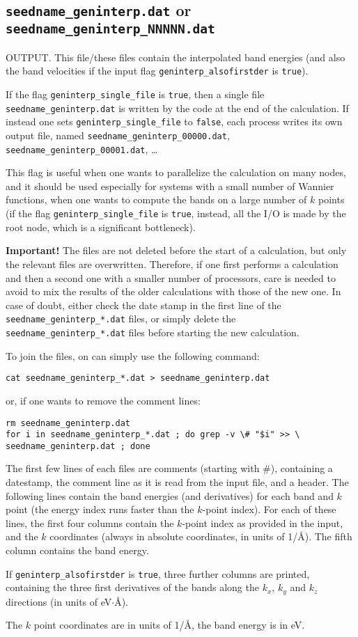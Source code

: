 \subsection{{\tt seedname\_geninterp.dat} or {\tt
    seedname\_geninterp\_NNNNN.dat}}
\label{sec:seedname.geninterp.dat}
OUTPUT. This file/these files contain the interpolated band energies (and also the band
velocities if the input flag \verb#geninterp_alsofirstder# is \verb#true#).

If the flag \verb|geninterp_single_file| is \verb|true|, then a single
file {\tt seedname\_geninterp.dat} is written by the code at the end
of the calculation. If instead one sets \verb|geninterp_single_file|
to \verb|false|, each process writes its own output file, named
{\tt seedname\_geninterp\_00000.dat}, {\tt
  seedname\_geninterp\_00001.dat}, \ldots

This flag is useful when one wants to parallelize the calculation on
many nodes, and it should be used especially for systems with a small
number of Wannier functions, when one wants to compute the bands on a
large number of $k$ points (if the flag \verb|geninterp_single_file|
is \verb|true|, instead, all the I/O is made by the root node, which
is a significant bottleneck).

{\bf Important!} The files are not deleted before the start of a
calculation, but only the relevant files are overwritten. Therefore,
if one first performs a calculation and then a second one with a smaller
number of processors, care is needed to avoid to mix the results of
the older calculations with those of the new one. In case of doubt,
either check the date stamp in the first line of the {\tt
    seedname\_geninterp\_*.dat} files, or simply
delete the  {\tt
    seedname\_geninterp\_*.dat} files before starting the new
  calculation.

To join the files, on can simply use the following command:
\begin{verbatim}
cat seedname_geninterp_*.dat > seedname_geninterp.dat
\end{verbatim}
or, if one wants to remove the comment lines:
\begin{verbatim}
rm seedname_geninterp.dat
for i in seedname_geninterp_*.dat ; do grep -v \# "$i" >> \
seedname_geninterp.dat ; done
\end{verbatim}


The first few lines of each files are comments (starting with \#),
containing a datestamp, the
comment line as it is read from the input file, and a header.
The following lines contain the band energies (and
derivatives) for each band and $k$ point (the energy
index runs faster than the $k$-point index).
For each of these lines, the first four columns contain the $k$-point index as provided in the
input, and the $k$ coordinates (always in absolute coordinates, in
units of 1/\AA).
The fifth column contains the band energy.

If \verb#geninterp_alsofirstder# is \verb#true#, three further columns
are printed, containing the three first derivatives of the bands along the $k_x$, $k_y$
and $k_z$ directions (in units of eV$\cdot$\AA).

The $k$ point coordinates are in units of 1/\AA, the band energy is in eV.
